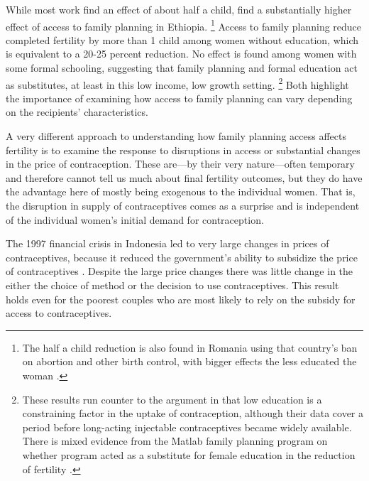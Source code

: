 \documentclass[letterpaper,12pt]{article}
\begin{document}
While most work find an effect of about half a child, \citet{Portner2011}
find a substantially higher effect of access to family planning in Ethiopia.%
\footnote{
The half a child reduction is also found in Romania using that country's 
ban on abortion and other birth control, with bigger effects the less
educated the woman \citep{Pop-Eleches2010}.
}
Access to family planning reduce completed fertility by more than 1 child among 
women without education, which is equivalent to a 20-25 percent reduction.
No effect is found among women with some formal schooling, suggesting that 
family planning and formal education act as 
substitutes, at least in this low income, low growth setting.%
\footnote{
These results run counter to the argument in \citet{Feyisetan1996}
that low education is a constraining factor in the uptake of contraception,
although their data cover a period before long-acting injectable
contraceptives became widely available.
There is mixed evidence from the Matlab family planning program on
whether program acted as a substitute for female education in the
reduction of fertility \citep{Sinha2005,Joshi2007}.
}
Both highlight the importance of examining how access to family planning
can vary depending on the recipients' characteristics.


A very different approach to understanding how family planning access
affects fertility is to examine the response to disruptions in access
or substantial changes in the price of contraception.
These are---by their very nature---often temporary and therefore
cannot tell us much about final fertility outcomes, but they do have
the advantage here of mostly being exogenous to the individual women.
That is, the disruption in supply of contraceptives comes as a
surprise and is independent of the individual women's initial
demand for contraception.

The 1997 financial crisis in Indonesia led to very large changes
in prices of contraceptives, because it reduced the government's
ability to subsidize the price of contraceptives \citep{McKelvey2012}.
Despite the large price changes there was little change in the 
either the choice of method or the decision to use contraceptives.
This result holds even for the poorest couples who are most likely
to rely on the subsidy for access to contraceptives.
\end{document}
